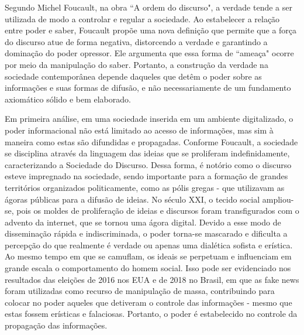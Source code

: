 \documentclass{article}
\begin{document}
Segundo Michel Foucault, na obra “A ordem do discurso", a verdade tende a ser utilizada de modo a controlar e regular a sociedade. Ao estabelecer a relação entre poder e saber, Foucault propõe uma nova definição que permite que a força do discurso atue de forma negativa, distorcendo a verdade e garantindo a dominação do poder opressor. Ele argumenta que essa forma de “ameaça" ocorre por meio da manipulação do saber. Portanto, a construção da verdade na sociedade contemporânea depende daqueles que detêm o poder sobre as informações e suas formas de difusão, e não necessariamente de um fundamento axiomático sólido e bem elaborado.

Em primeira análise, em uma sociedade inserida em um ambiente digitalizado, o poder informacional não está limitado ao acesso de informações, mas sim à maneira como estas são difundidas e propagadas. Conforme Foucault, a sociedade se disciplina através da linguagem das ideias que se proliferam indefinidamente, caracterizando a Sociedade do Discurso. Dessa forma, é notório como o discurso esteve impregnado na sociedade, sendo importante para a formação de grandes territórios organizados politicamente, como as pólis gregas - que utilizavam as ágoras públicas para a difusão de ideias. No século XXI, o tecido social ampliou-se, pois os moldes de proliferação de ideias e discursos foram transfigurados com o advento da internet, que se tornou uma ágora digital. Devido a esse modo de disseminação rápida e indiscriminada, o poder torna-se mascarado e dificulta a percepção do que realmente é verdade ou apenas uma dialética sofista e erística. Ao mesmo tempo em que se camuflam, os ideais se perpetuam e influenciam em grande escala o comportamento do homem social. Isso pode ser evidenciado nos resultados das eleições de 2016 nos EUA e de 2018 no Brasil, em que as fake news foram utilizadas como recurso de manipulação de massa, contribuindo para colocar no poder aqueles que detiveram o controle das informações - mesmo que estas fossem erísticas e falaciosas. Portanto, o poder é estabelecido no controle da propagação das informações.
\end{document}
